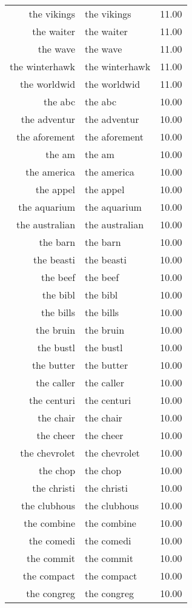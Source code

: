 \begin{table}[ht]
\begin{tabular}{rlr}
  the vikings & the vikings & 11.00 \\ 
  the waiter & the waiter & 11.00 \\ 
  the wave & the wave & 11.00 \\ 
  the winterhawk & the winterhawk & 11.00 \\ 
  the worldwid & the worldwid & 11.00 \\ 
  the abc & the abc & 10.00 \\ 
  the adventur & the adventur & 10.00 \\ 
  the aforement & the aforement & 10.00 \\ 
  the am & the am & 10.00 \\ 
  the america & the america & 10.00 \\ 
  the appel & the appel & 10.00 \\ 
  the aquarium & the aquarium & 10.00 \\ 
  the australian & the australian & 10.00 \\ 
  the barn & the barn & 10.00 \\ 
  the beasti & the beasti & 10.00 \\ 
  the beef & the beef & 10.00 \\ 
  the bibl & the bibl & 10.00 \\ 
  the bills & the bills & 10.00 \\ 
  the bruin & the bruin & 10.00 \\ 
  the bustl & the bustl & 10.00 \\ 
  the butter & the butter & 10.00 \\ 
  the caller & the caller & 10.00 \\ 
  the centuri & the centuri & 10.00 \\ 
  the chair & the chair & 10.00 \\ 
  the cheer & the cheer & 10.00 \\ 
  the chevrolet & the chevrolet & 10.00 \\ 
  the chop & the chop & 10.00 \\ 
  the christi & the christi & 10.00 \\ 
  the clubhous & the clubhous & 10.00 \\ 
  the combine & the combine & 10.00 \\ 
  the comedi & the comedi & 10.00 \\ 
  the commit & the commit & 10.00 \\ 
  the compact & the compact & 10.00 \\ 
  the congreg & the congreg & 10.00 \\ 

\end{tabular}
\end{table}
